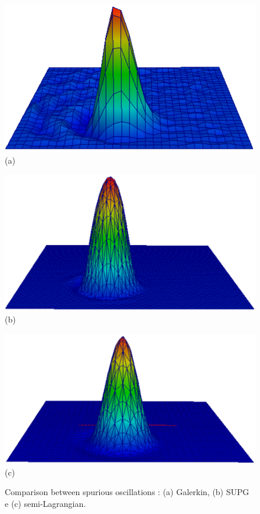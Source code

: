 \begin{figure}[H]
     \begin{minipage}{.32\linewidth}
      \centering
      \includegraphics[scale=0.15]{./02_chaps/cap_review/figure/galerkin.png}\\
      (a)
     \end{minipage}%
     \begin{minipage}{.32\linewidth}
      \centering
      \includegraphics[scale=0.15]{./02_chaps/cap_review/figure/SUPG.png}\\
      (b)
     \end{minipage}%
     \begin{minipage}{.35\linewidth}
      \centering
      \includegraphics[scale=0.15]{./02_chaps/cap_review/figure/semilagrangian.png}\\
      (c)
     \end{minipage}%
     \medskip
     \caption{Comparison between spurious oscillations \cite{silva2011}:
              (a) Galerkin,
              (b) SUPG e 
              (c) semi-Lagrangian.}
     \label{procedimentos oscilacoes espurias}
\end{figure}



